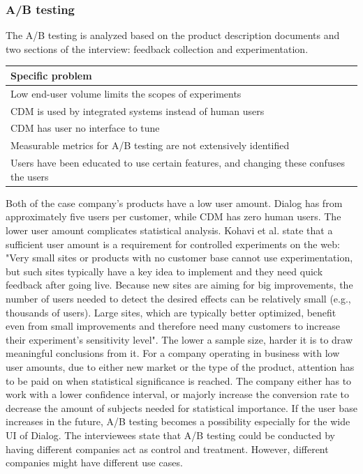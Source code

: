 \documentclass[english]{tktltiki2}
\theoremstyle{definition}
\theoremstyle{remark}
\begin{document}
\subsubsection{A/B testing}
The A/B testing is analyzed based on the product description documents and two sections of the interview: feedback collection and experimentation.

\begin{center}
    \begin{tabular}{ | p{12cm} |}
    \hline
    \textbf{Specific problem} \\ \hline
    Low end-user volume limits the scopes of experiments \\ \hline
	CDM is used by integrated systems instead of human users \\ \hline
	CDM has user no interface to tune \\ \hline
    Measurable metrics for A/B testing are not extensively identified \\ \hline
	Users have been educated to use certain features, and changing these confuses the users \\ 
    \hline
    \end{tabular}
\end{center}

Both of the case company's products have a low user amount. Dialog has from approximately five users per customer, while CDM has zero human users. The lower user amount complicates statistical analysis. Kohavi et al. \cite{kohavi2009online} state that a sufficient user amount is a requirement for controlled experiments on the web: "Very small sites or products with no customer base cannot use experimentation, but such sites typically have a key idea to implement and they need quick feedback after going live. Because new sites are aiming for big improvements, the number of users needed to detect the desired effects can be relatively small (e.g., thousands of users). Large sites, which are typically better optimized, benefit even from small improvements and therefore need many customers to increase their experiment’s sensitivity level". The lower a sample size, harder it is to draw meaningful conclusions from it. For a company operating in business with low user amounts, due to either new market or the type of the product, attention has to be paid on when statistical significance is reached. The company either has to work with a lower confidence interval, or majorly increase the conversion rate to decrease the amount of subjects needed for statistical importance. If the user base increases in the future, A/B testing becomes a possibility especially for the wide UI of Dialog. The interviewees state that A/B testing could be conducted by having different companies act as control and treatment. However, different companies might have different use cases.
\end{document}
